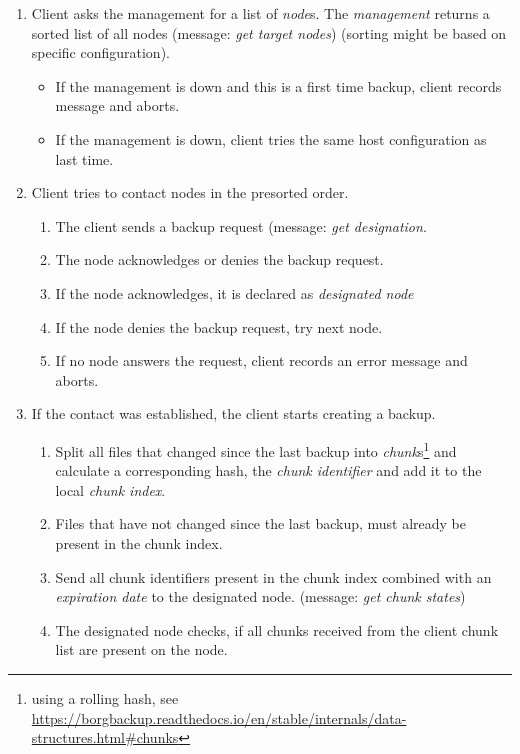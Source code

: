 \begin{enumerate}
    \item Client asks the management for a list of \emph{node}s. The \emph{management} returns a sorted list of all nodes (message: \emph{get target nodes}) (sorting might be based on specific configuration).
        \begin{itemize}
            \item If the management is down and this is a first time backup, client records message and aborts.
            \item If the management is down, client tries the same host configuration as last time.
        \end{itemize}
    \item Client tries to contact nodes in the presorted order.
        \begin{enumerate}
            \item The client sends a backup request (message: \emph{get designation}.
            \item The node acknowledges or denies the backup request.
            \item If the node acknowledges, it is declared as \emph{designated node}
            \item If the node denies the backup request, try next node.
            \item If no node answers the request, client records an error message and aborts.
       \end{enumerate}
   \item If the contact was established, the client starts creating a backup.
        \begin{enumerate}
            \item Split all files that changed since the last backup into \emph{chunk}s\footnote{using a rolling hash, see \url{https://borgbackup.readthedocs.io/en/stable/internals/data-structures.html\#chunks}} and calculate a corresponding hash, the \emph{chunk identifier} and add it to the local \emph{chunk index}.
            \item Files that have not changed since the last backup, must already be present in the chunk index.
            \item Send all chunk identifiers present in the chunk index combined with an \emph{expiration date} to the designated node. (message: \emph{get chunk states})
            \item The designated node checks, if all chunks received from the client chunk list are present on the node.

\end{enumerate}
\end{enumerate}
